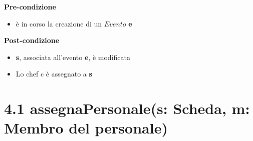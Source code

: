 \documentclass[12pt]{extarticle}
\begin{document}
\textbf{Pre-condizione}
\begin{itemize}
  \item è in corso la creazione di un $Evento$ \textbf{e}
\end{itemize} 
\textbf{Post-condizione}
\begin{itemize}
  \item \textbf{s}, associata all'evento \textbf{e}, è modificata
  \item Lo chef c è assegnato a \textbf{s}
\end{itemize} 

%
%
%
%

 

\section*{4.1 assegnaPersonale(s: Scheda, m: Membro del personale)}
\end{document}
